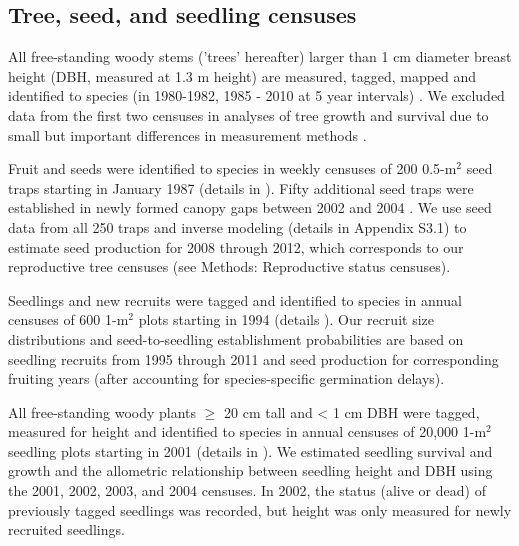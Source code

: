 \documentclass[b5paper,justified]{tufte-book} %
\begin{document}
\begin{fullwidth}
\subsection{Tree, seed, and seedling censuses}
All free-standing woody stems ('trees' hereafter) larger than 1 cm diameter breast height (DBH, measured at 1.3 m height) are measured, tagged, mapped and identified to species (in 1980-1982, 1985 - 2010 at 5 year intervals) \citep{Condit1998}. We excluded data from the first two censuses in analyses of tree growth and survival due to small but important differences in measurement methods \citep{Condit1998}. 

Fruit and seeds were identified to species in weekly censuses of 200 0.5-m$^2$ seed traps starting in January 1987 (details in \citealt{Wright2005a}). Fifty additional seed traps were established in newly formed canopy gaps between 2002 and 2004 \citep{Puerta-Pinero2013}. We use seed data from all 250 traps and inverse modeling (details in Appendix S3.1) to estimate seed production for 2008 through 2012, which corresponds to our reproductive tree censuses (see Methods: Reproductive status censuses).

Seedlings and new recruits were tagged and identified to species in annual censuses of 600 1-m$^2$ plots starting in 1994 (details \citealt{Wright2005a}). Our recruit size distributions and seed-to-seedling establishment probabilities are based on seedling recruits from 1995 through 2011 and seed production for corresponding fruiting years (after accounting for species-specific germination delays). 

All free-standing woody plants $\geq$ 20 cm tall and < 1 cm DBH were tagged, measured for height and identified to species in annual censuses of 20,000 1-m$^2$ seedling plots starting in 2001 (details in \citealt{Comita2007}). We estimated seedling survival and growth and the allometric relationship between seedling height and DBH using the 2001, 2002, 2003, and 2004 censuses. In 2002, the status (alive or dead) of previously tagged seedlings was recorded, but height was only measured for newly recruited seedlings.


\end{fullwidth}
\end{document}
